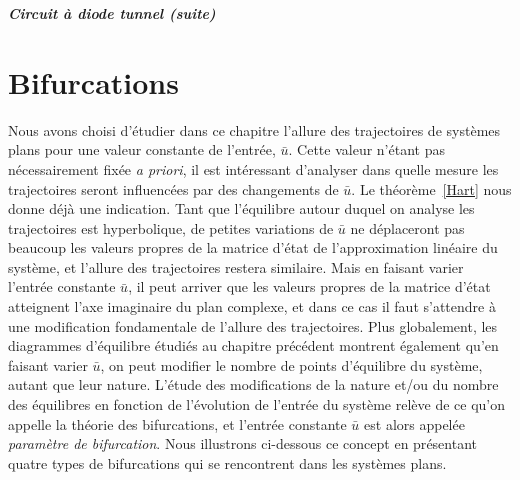 \begin{exemple}{\bf \em Circuit {à} diode tunnel (suite)}


\section{Bifurcations}

Nous avons choisi d'{é}tudier dans ce chapitre l'allure des trajectoires de syst{è}mes plans pour une valeur constante de l'entr{é}e, $\bar u$. Cette valeur n'{é}tant pas
n{é}cessairement fix{é}e {\em a priori}, il est int{é}ressant d'analyser dans quelle
mesure les trajectoires seront influenc{é}es par des changements de $\bar u$. Le
th{é}or{è}me~\ref{Hart} nous donne d{é}j{à} une indication. Tant que l'{é}quilibre autour
duquel on analyse les trajectoires est hyperbolique, de petites variations de $\bar u$ ne
d{é}placeront pas beaucoup les valeurs propres de la matrice d'{é}tat de l'approximation
lin{é}aire du syst{è}me, et l'allure des trajectoires restera similaire. Mais en faisant
varier l'entr{é}e constante $\bar u$, il peut arriver que les
valeurs propres de la matrice d'{é}tat atteignent l'axe imaginaire du plan complexe, et
dans ce cas il faut s'attendre
{à} une modification fondamentale de l'allure des trajectoires. Plus globalement, les
diagrammes d'{é}quilibre {é}tudi{é}s au chapitre pr{é}c{é}dent montrent {é}galement qu'en
faisant varier $\bar u$, on peut modifier le nombre de points d'{é}quilibre du syst{è}me,
autant que leur nature. L'{é}tude des modifications de la nature et/ou du nombre des
{é}quilibres en fonction de l'{é}volution de l'entr{é}e du syst{è}me
rel{è}ve de ce qu'on appelle la th{é}orie des bifurcations, et l'entr{é}e constante $\bar u$ est alors
appel{é}e {\em param{è}tre de bifurcation}. Nous illustrons ci-dessous ce concept en
pr{é}sentant quatre types de bifurcations qui se rencontrent dans les syst{è}mes plans.


\end{exemple}
